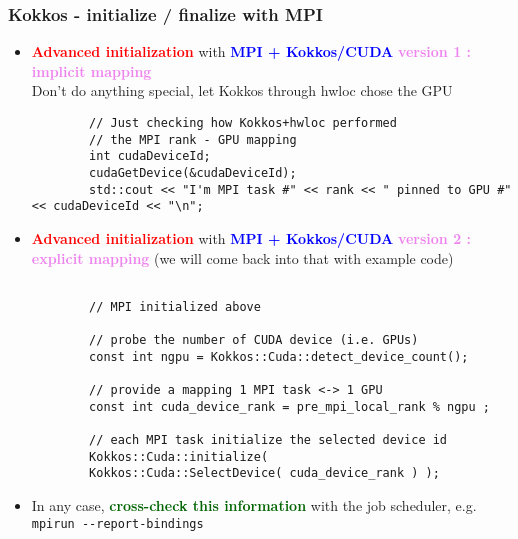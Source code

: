 \begin{frame}[fragile=singleslide]
  \frametitle{Kokkos - initialize / finalize with MPI}

  \begin{itemize}
  \item \textcolor{red}{\textbf{Advanced initialization}} with \textcolor{blue}{\textbf{MPI + Kokkos/CUDA}} \textcolor{violet}{\textbf{version 1 : implicit mapping}}\\
    Don't do anything special, let Kokkos through hwloc chose the GPU
    {\scriptsize
      \begin{verbatim}
        // Just checking how Kokkos+hwloc performed
        // the MPI rank - GPU mapping 
        int cudaDeviceId;
        cudaGetDevice(&cudaDeviceId);
        std::cout << "I'm MPI task #" << rank << " pinned to GPU #" << cudaDeviceId << "\n";
      \end{verbatim} 
    }
  \item \textcolor{red}{\textbf{Advanced initialization}} with \textcolor{blue}{\textbf{MPI + Kokkos/CUDA}} \textcolor{violet}{\textbf{version 2 : explicit mapping}}
    (we will come back into that with example code)
    {\scriptsize
      \begin{verbatim}
        
        // MPI initialized above
        
        // probe the number of CUDA device (i.e. GPUs)
        const int ngpu = Kokkos::Cuda::detect_device_count();
        
        // provide a mapping 1 MPI task <-> 1 GPU
        const int cuda_device_rank = pre_mpi_local_rank % ngpu ;
        
        // each MPI task initialize the selected device id
        Kokkos::Cuda::initialize(
        Kokkos::Cuda::SelectDevice( cuda_device_rank ) );
      \end{verbatim}
    }
  \item In any case, \textcolor{darkgreen}{\bf cross-check this information} with the job scheduler, e.g. \texttt{mpirun \--\--report-bindings}
  \end{itemize}
\end{frame}
